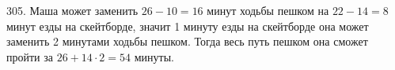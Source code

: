 305. Маша может заменить $26-10=16$ минут ходьбы пешком на $22-14=8$ минут езды на скейтборде, значит 1 минуту езды на скейтборде она может заменить 2 минутами ходьбы пешком. Тогда весь путь пешком она сможет пройти за $26+14\cdot2=54$ минуты.\\
